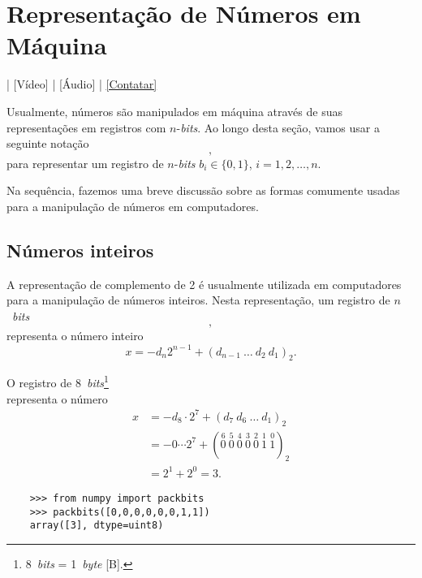 \section{Representação de Números em Máquina}\label{cap_artm_sec_repummaq}

\begin{flushright}
  [YouTube] | [Vídeo] | [Áudio] | \href{https://phkonzen.github.io/notas/contato.html}{[Contatar]}
\end{flushright}

Usualmente, números são manipulados em máquina através de suas representações em registros com $n$-{\it bits}. Ao longo desta seção, vamos usar a seguinte notação
\begin{equation}
  [b_1 ~ b_2 ~ b_3 ~ \cdots ~ b_n],
\end{equation}
para representar um registro de $n$-{\it bits} $b_i\in\{0, 1\}$, $i=1, 2, \dotsc, n$.

Na sequência, fazemos uma breve discussão sobre as formas comumente usadas para a manipulação de números em computadores.

\subsection{Números inteiros}

A representação de complemento de 2 é usualmente utilizada em computadores para a manipulação de números inteiros. Nesta representação, um registro de $n$~{\it bits}
\begin{equation}
  [b_1 ~ b_2 ~ b_3 ~ \cdots ~ b_n],
\end{equation}
representa o número inteiro
\begin{equation}
  x = -d_n2^{n-1} + (d_{n-1}~\ldots~d_2~d_1)_2.
\end{equation}

\begin{ex}
  O registro de 8~{\it bits}\footnote{8~{\it bits} = 1~{\it byte} [B].}
  \begin{equation}
    [1 ~ 1 ~ 0 ~ 0 ~ 0 ~ 0 ~ 0 ~ 0]
  \end{equation}
  representa o número
  \begin{align}
    x &= -d_8\cdot 2^7 + (d_7~d_6~\ldots~d_1)_2\\
      &= -0\cdots 2^{7} + (\stackrel{6}{0}~\stackrel{5}{0}~\stackrel{4}{0}~\stackrel{3}{0}~\stackrel{2}{0}~\stackrel{1}{1}~\stackrel{0}{1})_2\\
      &= 2^1 + 2^0 = 3.
  \end{align}
  
  \ifispython
  \begin{lstlisting}
    >>> from numpy import packbits
    >>> packbits([0,0,0,0,0,0,1,1])
    array([3], dtype=uint8)
  \end{lstlisting}
  \fi
\end{ex}


